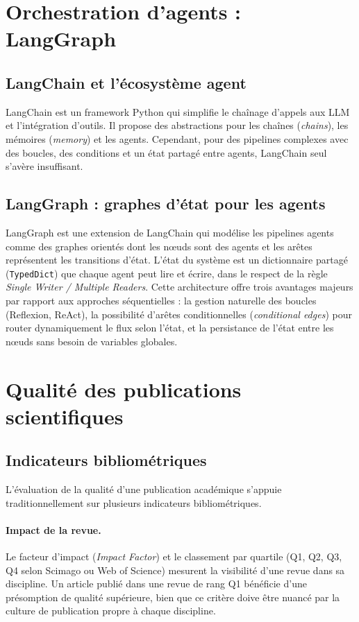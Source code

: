 \section{Orchestration d'agents : LangGraph}

\subsection{LangChain et l'écosystème agent}

LangChain \cite{chase2022langchain} est un framework Python qui simplifie
le chaînage d'appels aux LLM et l'intégration d'outils. Il propose des
abstractions pour les chaînes (\textit{chains}), les mémoires (\textit{memory})
et les agents. Cependant, pour des pipelines complexes avec des boucles,
des conditions et un état partagé entre agents, LangChain seul s'avère
insuffisant.

\subsection{LangGraph : graphes d'état pour les agents}

LangGraph \cite{langgraph2024} est une extension de LangChain qui modélise
les pipelines agents comme des graphes orientés dont les nœuds sont des
agents et les arêtes représentent les transitions d'état. L'état du système
est un dictionnaire partagé (\texttt{TypedDict}) que chaque agent peut lire
et écrire, dans le respect de la règle \textit{Single Writer / Multiple
Readers}. Cette architecture offre trois avantages majeurs par rapport
aux approches séquentielles : la gestion naturelle des boucles (Reflexion,
ReAct), la possibilité d'arêtes conditionnelles (\textit{conditional edges})
pour router dynamiquement le flux selon l'état, et la persistance de l'état
entre les nœuds sans besoin de variables globales.

\section{Qualité des publications scientifiques}

\subsection{Indicateurs bibliométriques}

L'évaluation de la qualité d'une publication académique s'appuie
traditionnellement sur plusieurs indicateurs bibliométriques.

\paragraph{Impact de la revue.}
Le facteur d'impact (\textit{Impact Factor}) \cite{garfield1972citation}
et le classement par quartile (Q1, Q2, Q3, Q4 selon Scimago ou Web of Science)
mesurent la visibilité d'une revue dans sa discipline. Un article publié dans
une revue de rang Q1 bénéficie d'une présomption de qualité supérieure,
bien que ce critère doive être nuancé par la culture de publication propre
à chaque discipline.

